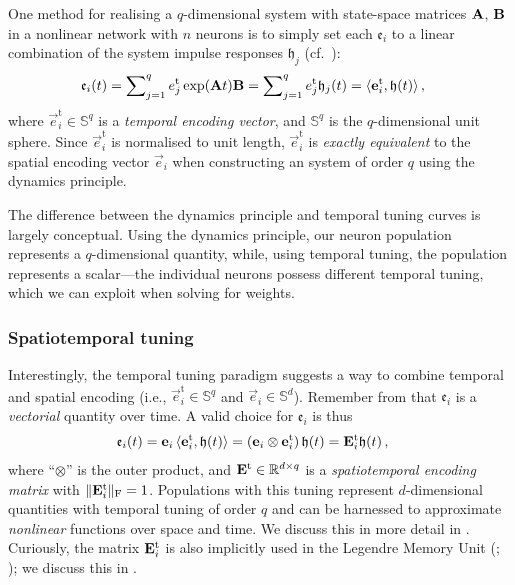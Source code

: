 One method for realising a $q$-dimensional \LTI system with state-space matrices $\mathbf{A}$, $\mathbf{B}$ in a nonlinear network with $n$ neurons is to simply set each $\mathfrak{e}_i$ to a linear combination of the system impulse responses $\mathfrak{h}_j$ (cf.~):
\begin{align}
	\mathfrak{e}_i(t) &= \sum\nolimits_{j = 1}^q {e}^\mathrm{t}_j \exp(\mathbf{A} t) \mathbf{B} = \sum\nolimits_{j = 1}^q {e}^\mathrm{t}_j \mathfrak{h}_j(t)  = \langle \mathbf{e}_i^\mathrm{t}, \mathbf{\mathfrak{h}}(t) \rangle \,,
	\label{eqn:temporal_encoding_vector}
\end{align}
where $\vec{e}_i^\mathrm{t} \in \mathbb{S}^q$ is a \emph{temporal encoding vector}, and $\mathbb{S}^q$ is the $q$-dimensional unit sphere.
Since $\vec{e}_i^\mathrm{t}$ is normalised to unit length, $\vec{e}_i^\mathrm{t}$ is \emph{exactly equivalent} to the spatial encoding vector $\vec e_i$ when constructing an \LTI system of order $q$ using the \NEF dynamics principle.

The difference between the dynamics principle and temporal tuning curves is largely conceptual.
Using the \NEF dynamics principle, our neuron population represents a $q$-dimensional quantity, while, using temporal tuning, the population represents a scalar---the individual neurons possess different temporal tuning, which we can exploit when solving for weights.

\subsubsection{Spatiotemporal tuning}
Interestingly, the temporal tuning paradigm suggests a way to combine temporal and spatial encoding (i.e., $\vec{e}_i^\mathrm{t} \in \mathbb{S}^q$ and $\vec{e}_i \in \mathbb{S}^d$).
Remember from  that $\mathfrak{e}_i$ is a \emph{vectorial} quantity over time.
A valid choice for  $\mathfrak{e}_i$ is thus
\begin{align}
	\mathfrak{e}_i(t) &= \mathbf{e}_i \, \langle \mathbf{e}_i^\mathrm{t}, \mathbf{\mathfrak{h}}(t) \rangle = (\mathbf{e}_i \otimes \mathbf{e}_i^\mathrm{t}) \, \mathfrak{h}(t) = \mathbf{E}_i^\mathrm{t} \mathfrak{h}(t)\,,
	\label{eqn:spatio_temporal_encoding_vector}
\end{align}
where \enquote{$\otimes$} is the outer product, and $\mathbf{E}^\mathrm{t} \in \mathbb{R}^{d \times q}$ is a \emph{spatiotemporal encoding matrix} with $\| \mathbf{E}_i^\mathrm{t} \|_\mathrm{F} = 1$.
Populations with this tuning represent $d$-dimensional quantities with temporal tuning of order $q$ and can be harnessed to approximate \emph{nonlinear} functions over space and time.
We discuss this in more detail in .
Curiously, the matrix $\mathbf{E}_i^\mathrm{t}$ is also implicitly used in the Legendre Memory Unit (\LMU; \cite{voelker2019lmu}); we discuss this in .

